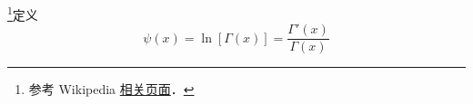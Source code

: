 
\begin{issues}
\issueDraft
\end{issues}

\footnote{参考 Wikipedia \href{https://en.wikipedia.org/wiki/Digamma_function}{相关页面}．}定义
\begin{equation}
\psi(x) = \ln[\Gamma(x)] = \frac{\Gamma'(x)}{\Gamma(x)}
\end{equation}
